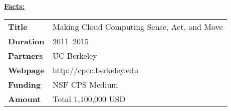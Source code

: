 \textcolor{\workinggroupboxtextcolor}{
	\textbf{\underline{Facts:}}
	\newline
	\newline
	\begin{tabular}{l p{}}
        \textbf{Title} & Making Cloud Computing Sense, Act, and Move \\
		\textbf{Duration} & 2011--2015 \\
		\textbf{Partners} & UC Berkeley \\
		\textbf{Webpage} & http://cpcc.berkeley.edu \\
		\textbf{Funding} & NSF CPS Medium \\
		\textbf{Amount} & Total 1,100,000 USD 
	\end{tabular}
}